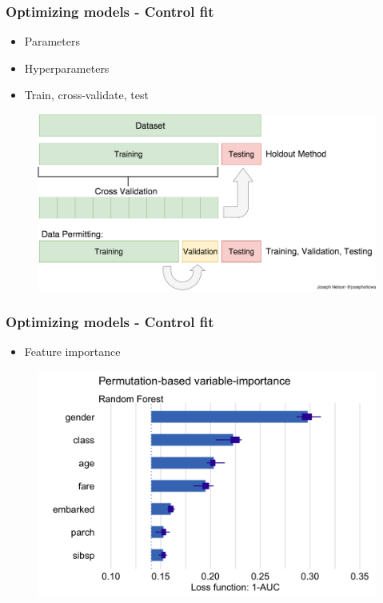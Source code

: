 \begin{frame}\frametitle{Optimizing models - Control fit}
   \begin{itemize}
      \item Parameters
      \item Hyperparameters
      \item Train, cross-validate, test
   \end{itemize}
   \begin{figure}[H]
      \includegraphics[scale=.25]{../images/illustrations/model_split_data.png}
   \end{figure}
\end{frame}

\begin{frame}\frametitle{Optimizing models - Control fit}
   \begin{itemize}
      \item Feature importance
   \end{itemize}
   \begin{figure}[H]
      \includegraphics[scale=.25]{../images/illustrations/model_feature_importance.png}
   \end{figure}
\end{frame}




